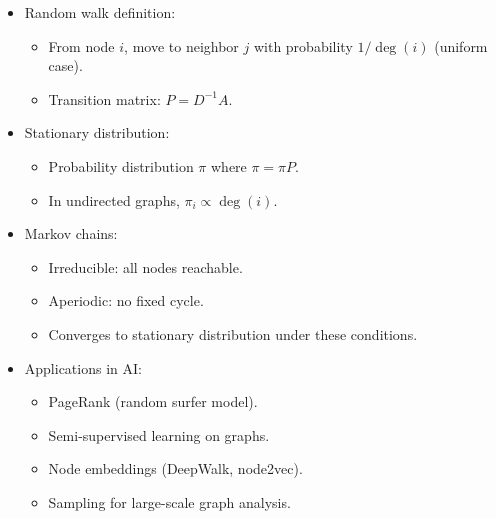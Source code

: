 \documentclass[
  letterpaper,
  DIV=11,
  numbers=noendperiod]{scrreprt}
\providecommand{\tightlist}{%
  \setlength{\itemsep}{0pt}\setlength{\parskip}{0pt}}
\begin{document}
\begin{itemize}
\item
  Random walk definition:

  \begin{itemize}
  \tightlist
  \item
    From node \(i\), move to neighbor \(j\) with probability
    \(1/\deg(i)\) (uniform case).
  \item
    Transition matrix: \(P = D^{-1}A\).
  \end{itemize}
\item
  Stationary distribution:

  \begin{itemize}
  \tightlist
  \item
    Probability distribution \(\pi\) where \(\pi = \pi P\).
  \item
    In undirected graphs, \(\pi_i \propto \deg(i)\).
  \end{itemize}
\item
  Markov chains:

  \begin{itemize}
  \tightlist
  \item
    Irreducible: all nodes reachable.
  \item
    Aperiodic: no fixed cycle.
  \item
    Converges to stationary distribution under these conditions.
  \end{itemize}
\item
  Applications in AI:

  \begin{itemize}
  \tightlist
  \item
    PageRank (random surfer model).
  \item
    Semi-supervised learning on graphs.
  \item
    Node embeddings (DeepWalk, node2vec).
  \item
    Sampling for large-scale graph analysis.
  \end{itemize}
\end{itemize}
\end{document}
